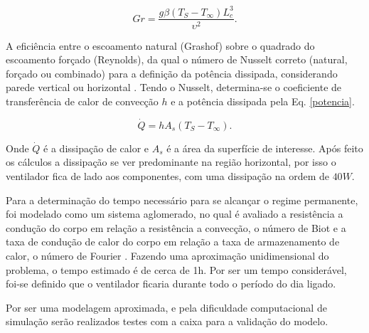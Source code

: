 \begin{equation}
	Gr= \frac{g \beta (T_S-T_{\infty})L_c^3}{\upsilon^2}.
	\label{grashof}
\end{equation}

A eficiência entre o escoamento natural (Grashof) sobre o quadrado do escoamento forçado (Reynolds), da qual o número de Nusselt correto (natural, forçado ou combinado) para a definição da potência dissipada, considerando parede vertical ou horizontal \cite{livro_transcal}. Tendo o Nusselt, determina-se o coeficiente de transferência de calor de convecção $h$ e a potência dissipada pela Eq. \ref{potencia}.

\begin{equation}
	\dot{Q}= hA_s(T_S-T_{\infty}).
	\label{potencia}
\end{equation}

Onde $\dot{Q}$ é a dissipação de calor e $A_s$ é a área da superfície de interesse. Após feito os cálculos a dissipação se ver predominante na região horizontal, por isso o ventilador fica de lado aos componentes, com uma dissipação na ordem de $40W$.

Para a determinação do tempo necessário para se alcançar o regime permanente, foi modelado como um sistema aglomerado, no qual é avaliado a resistência a condução do corpo em relação a resistência a convecção, o número de Biot e a taxa de condução de calor do corpo em relação a taxa de armazenamento de calor, o número de Fourier \cite{livro_transcal}. Fazendo uma aproximação unidimensional do problema, o tempo estimado é de cerca de 1h. Por ser um tempo considerável, foi-se definido que o ventilador ficaria durante todo o período do dia ligado.


Por ser uma modelagem aproximada, e pela dificuldade computacional de simulação serão realizados testes com a caixa para a validação do modelo. 


